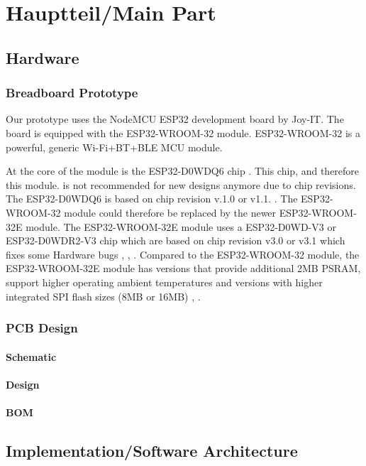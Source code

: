 \chapter{Hauptteil/Main Part}

\section{Hardware}
\subsection{Breadboard Prototype}
Our prototype uses the NodeMCU ESP32 development board by Joy-IT. The board is equipped with the ESP32-WROOM-32 module. ESP32-WROOM-32 is a powerful, generic Wi-Fi+BT+BLE MCU module. 

At the core of the module is the ESP32-D0WDQ6 chip \cite[6]{esp32-module}. This chip, and therefore this module. is not recommended for new designs anymore due to chip revisions. The ESP32-D0WDQ6 is based on chip revision v.1.0 or v1.1. \cite[11]{esp32-datasheet}. The ESP32-WROOM-32 module could therefore be replaced by the newer ESP32-WROOM-32E module. The ESP32-WROOM-32E module uses a ESP32-D0WD-V3 or ESP32-D0WDR2-V3 chip which are based on chip revision v3.0 or v3.1 which fixes some Hardware bugs \cite[1]{esp32-module-new}, \cite[11]{esp32-datasheet}, \cite[3-4]{esp32-errata}. Compared to the ESP32-WROOM-32 module, the ESP32-WROOM-32E module has versions that provide additional 2MB PSRAM, support higher operating ambient temperatures and versions with higher integrated SPI flash sizes (8MB or 16MB) \cite[2]{esp32-module-new}, \cite[6-7]{esp32-module}.

\subsection{PCB Design}
\subsubsection{Schematic}
\subsubsection{Design}
\subsubsection{BOM}

\section{Implementation/Software Architecture}
